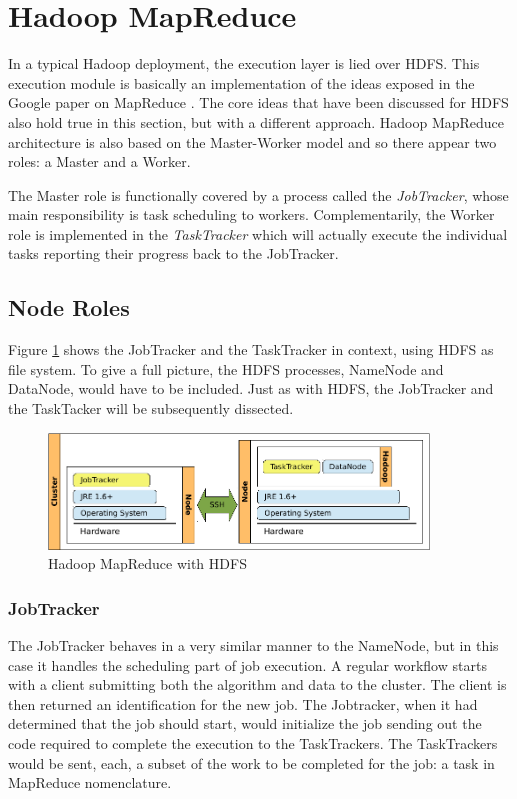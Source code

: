 \section{Hadoop MapReduce}\label{sec:hadoopmapred}
\noindent In a typical Hadoop deployment, the execution layer is lied over HDFS. This execution module is basically an implementation of the ideas exposed in the Google paper on MapReduce \cite{googlemapreduce}. The core ideas that have been discussed for HDFS also hold true in this section, but with a different approach. Hadoop MapReduce architecture is also based on the Master-Worker model and so there appear two roles: a Master and a Worker.

The Master role is functionally covered by a process called the \emph{JobTracker}, whose main responsibility is task scheduling to workers. Complementarily, the Worker role is implemented in the \emph{TaskTracker} which will actually execute the individual tasks reporting their progress back to the JobTracker.

\subsection{Node Roles}\label{subsec:rolesnodosmapred}
\noindent Figure \ref{fig:desplieguehadoopmapred} shows the JobTracker and the TaskTracker in context, using HDFS as file system. To give a full picture, the HDFS processes, NameNode and DataNode, would have to be included. Just as with HDFS, the JobTracker and the TaskTacker will be subsequently dissected.

\begin{figure}[tbp]
\begin{center}
\includegraphics[width=0.9\textwidth]{imagenes/020.pdf}
 \caption{Hadoop MapReduce with HDFS}
\label{fig:desplieguehadoopmapred}
\end{center}
\end{figure}

\subsubsection{JobTracker}\label{subsubsec:jobtracker}
\noindent The JobTracker behaves in a very similar manner to the NameNode, but in this case it handles the scheduling part of job execution. A regular workflow starts with a client submitting both the algorithm and data to the cluster. The client is then returned an identification for the new job. The Jobtracker, when it had determined that the job should start, would initialize the job sending out the code required to complete the execution to the TaskTrackers. The TaskTrackers would be sent, each, a subset of the work to be completed for the job: a task in MapReduce nomenclature.

